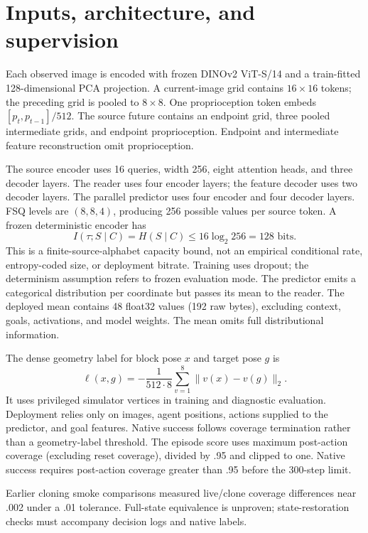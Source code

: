 \documentclass[10pt,twocolumn,letterpaper]{article}
\begin{document}
\section{Inputs, architecture, and supervision}
Each observed image is encoded with frozen DINOv2 ViT-S/14 and a train-fitted 128-dimensional PCA projection. A current-image grid contains $16\times16$ tokens; the preceding grid is pooled to $8\times8$. One proprioception token embeds $[p_t,p_{t-1}]/512$. The source future contains an endpoint grid, three pooled intermediate grids, and endpoint proprioception. Endpoint and intermediate feature reconstruction omit proprioception.

The source encoder uses 16 queries, width 256, eight attention heads, and three decoder layers. The reader uses four encoder layers; the feature decoder uses two decoder layers. The parallel predictor uses four encoder and four decoder layers. FSQ levels are $(8,8,4)$, producing 256 possible values per source token. A frozen deterministic encoder has
\begin{equation}
I(\tau;S\mid C)=H(S\mid C)\le16\log_2 256=128\text{ bits}.
\end{equation}
This is a finite-source-alphabet capacity bound, not an empirical conditional rate, entropy-coded size, or deployment bitrate. Training uses dropout; the determinism assumption refers to frozen evaluation mode. The predictor emits a categorical distribution per coordinate but passes its mean to the reader. The deployed mean contains 48 float32 values (192 raw bytes), excluding context, goals, activations, and model weights. The mean omits full distributional information.

The dense geometry label for block pose $x$ and target pose $g$ is
\begin{equation}
\ell(x,g)=-\frac{1}{512\cdot8}\sum_{v=1}^{8}\|v(x)-v(g)\|_2.
\end{equation}
It uses privileged simulator vertices in training and diagnostic evaluation. Deployment relies only on images, agent positions, actions supplied to the predictor, and goal features. Native success follows coverage termination rather than a geometry-label threshold. The episode score uses maximum post-action coverage (excluding reset coverage), divided by .95 and clipped to one. Native success requires post-action coverage greater than .95 before the 300-step limit.

Earlier cloning smoke comparisons measured live/clone coverage differences near .002 under a .01 tolerance. Full-state equivalence is unproven; state-restoration checks must accompany decision logs and native labels.
\end{document}
